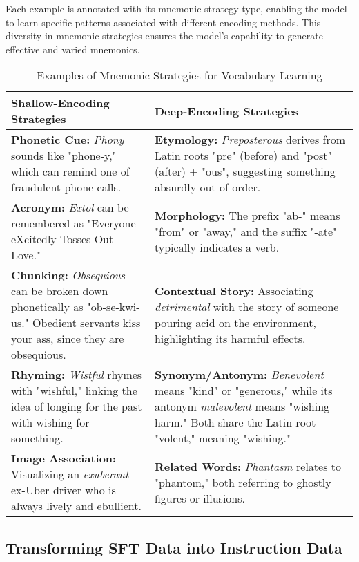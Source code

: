 \documentclass{article}
\begin{document}
Each example is annotated with its mnemonic strategy type, enabling the model to learn specific patterns associated with different encoding methods. This diversity in mnemonic strategies ensures the model's capability to generate effective and varied mnemonics.

\begin{table*}[ht]
\centering
\begin{tabular}{p{} p{}}
\textbf{Shallow-Encoding Strategies} & \textbf{Deep-Encoding Strategies} \\
\hline
\textbf{Phonetic Cue:} \textit{Phony} sounds like "phone-y," which can remind one of fraudulent phone calls. & \textbf{Etymology:} \textit{Preposterous} derives from Latin roots "pre" (before) and "post" (after) + "ous", suggesting something absurdly out of order. \\
\textbf{Acronym:} \textit{Extol} can be remembered as "Everyone eXcitedly Tosses Out Love." & \textbf{Morphology:} The prefix "ab-" means "from" or "away," and the suffix "-ate" typically indicates a verb. \\
\textbf{Chunking:} \textit{Obsequious} can be broken down phonetically as "ob-se-kwi-us." Obedient servants kiss your ass, since they are obsequious. & \textbf{Contextual Story:} Associating \textit{detrimental} with the story of someone pouring acid on the environment, highlighting its harmful effects. \\
\textbf{Rhyming:} \textit{Wistful} rhymes with "wishful," linking the idea of longing for the past with wishing for something. & \textbf{Synonym/Antonym:} \textit{Benevolent} means "kind" or "generous," while its antonym \textit{malevolent} means "wishing harm." Both share the Latin root "volent," meaning "wishing." \\
\textbf{Image Association:} Visualizing an \textit{exuberant} ex-Uber driver who is always lively and ebullient. & \textbf{Related Words:} \textit{Phantasm} relates to "phantom," both referring to ghostly figures or illusions. \\
\end{tabular}
\caption{Examples of Mnemonic Strategies for Vocabulary Learning}
\label{tab:mnemonic-strategies}
\end{table*}

\subsection{Transforming SFT Data into Instruction Data} \label{sec:met-instruction-data}
\end{document}
